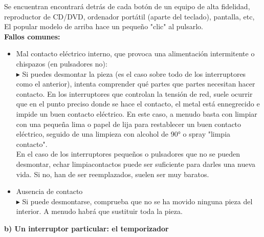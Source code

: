 \documentclass[a5paper,twoside,openany]{book}
\begin{document}
Se encuentran encontrará detrás de cada botón de un equipo de alta fidelidad, reproductor de CD/DVD, ordenador portátil (aparte del teclado), pantalla, etc,
El popular modelo de arriba hace un pequeño "clic" al pulsarlo.\\

\textbf{Fallos comunes:}
\begin{itemize}
\item Mal contacto eléctrico interno, que provoca una alimentación intermitente o chispazos (en pulsadores no):
\\

$\blacktriangleright$ Si puedes desmontar la pieza (es el caso sobre todo de los interruptores como el anterior), intenta comprender qué partes que partes necesitan hacer contacto. En los interruptores que controlan la tensión de red, suele ocurrir que en el punto preciso
donde se hace el contacto, el metal está ennegrecido e impide un buen contacto eléctrico.
En este caso, a menudo basta con limpiar con una pequeña lima o papel de lija para restablecer un buen contacto eléctrico, seguido de una limpieza con alcohol de 90° o spray "limpia contacto".
\\

En el caso de los interruptores pequeños o pulsadores que no se pueden desmontar, echar limpiacontactos puede ser suficiente para darles una nueva vida. Si no, han de ser reemplazados, suelen ser muy baratos.

\item Ausencia de contacto
\\

$\blacktriangleright$ Si puede desmontarse, comprueba que no se ha movido ninguna pieza del interior.
A menudo habrá que sustituir toda la pieza.
\\
\end{itemize}
\newpage

\textbf{b) Un interruptor particular: el temporizador}
\end{document}

